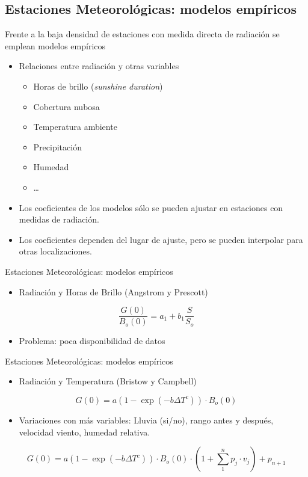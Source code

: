 \documentclass[xcolor={usenames,svgnames,dvipsnames}]{beamer}
\begin{document}
\subsection{Estaciones Meteorológicas: modelos empíricos}
\label{sec-6-3}
\begin{frame}[label=sec-6-3-1]{Frente a la baja densidad de estaciones con medida directa de radiación se emplean modelos empíricos}
\begin{itemize}
\item Relaciones entre radiación y otras variables
\begin{itemize}
\item Horas de brillo (\emph{sunshine duration})
\item Cobertura nubosa
\item Temperatura ambiente
\item Precipitación
\item Humedad
\item \ldots{}
\end{itemize}
\item Los coeficientes de los modelos sólo se pueden ajustar en estaciones
con medidas de radiación.
\item Los coeficientes dependen del lugar de ajuste, pero se pueden
interpolar para otras localizaciones.
\end{itemize}
\end{frame}

\begin{frame}[label=sec-6-3-2]{Estaciones Meteorológicas: modelos empíricos}
\begin{itemize}
\item Radiación y Horas de Brillo (Angstrom y Prescott)
\end{itemize}

\[
\frac{G(0)}{B_o(0)} = a_1 + b_1 \frac{S}{S_o}
\]

\begin{itemize}
\item Problema: poca disponibilidad de datos
\end{itemize}
\end{frame}

\begin{frame}[label=sec-6-3-3]{Estaciones Meteorológicas: modelos empíricos}
\begin{itemize}
\item Radiación y Temperatura (Bristow y Campbell)
\end{itemize}
\[
G(0) = a \left(1 - \exp(-b \Delta T^c)\right) \cdot B_o(0)
\]

\begin{itemize}
\item Variaciones con más variables: Lluvia (si/no), rango antes y después, velocidad viento, humedad relativa.
\end{itemize}

\[
  G(0) = a \left(1 - \exp(-b \Delta T^c)\right) \cdot B_o(0) \cdot \left(1 +
    \sum_1^n p_j \cdot v_j \right) + p_{n+1}
\]

\nocite{Antonanzas-Torres.Sanz-Garcia.ea2013}
\end{frame}
\end{document}
